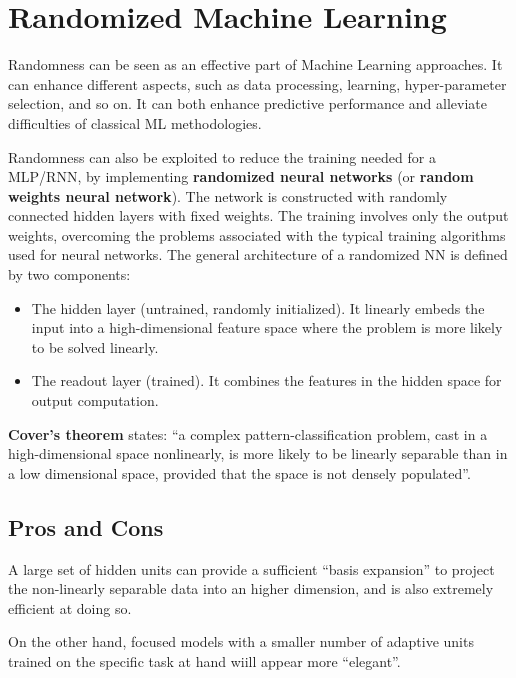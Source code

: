 \chapter{Randomized Machine Learning}

Randomness can be seen as an effective part of Machine Learning approaches. It can enhance different aspects, such as data processing, learning, hyper-parameter selection, and so on. It can both enhance predictive performance and alleviate difficulties of classical ML methodologies.

Randomness can also be exploited to reduce the training needed for a MLP/RNN, by implementing \textbf{randomized neural networks} (or \textbf{random weights neural network}). The network is constructed with randomly connected hidden layers with fixed weights. The training involves only the output weights, overcoming the problems associated with the typical training algorithms used for neural networks. The general architecture of a randomized NN is defined by two components:

\begin{itemize}
    \item The hidden layer (untrained, randomly initialized). It linearly embeds the input into a high-dimensional feature space where the problem is more likely to be solved linearly.

    \item The readout layer (trained). It combines the features in the hidden space for output computation.
\end{itemize}

\textbf{Cover's theorem} states: ``a complex pattern-classification problem, cast in a high-dimensional space nonlinearly, is more likely to be linearly separable than in a low dimensional space, provided that the space is not densely populated''.

\section{Pros and Cons}

A large set of hidden units can provide a sufficient ``basis expansion'' to project the non-linearly separable data into an higher dimension, and is also extremely efficient at doing so.

On the other hand, focused models with a smaller number of adaptive units trained on the specific task at hand wiill appear more ``elegant''.